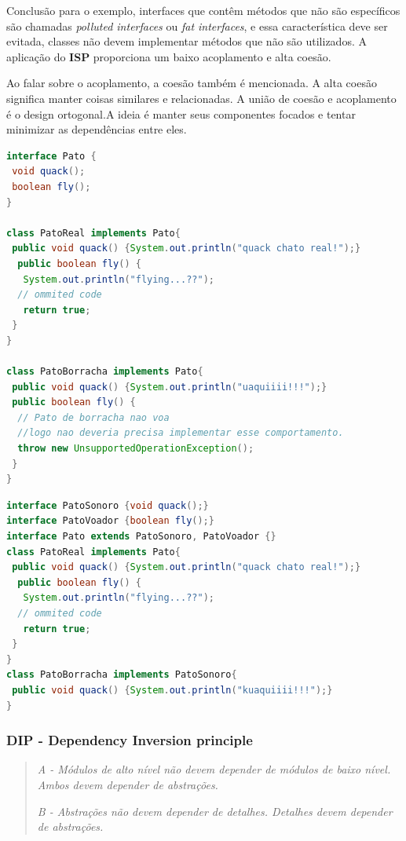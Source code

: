 \documentclass[12pt]{article}
\begin{document}
Conclusão para o exemplo, interfaces que contêm métodos que não são específicos são chamadas \textit{polluted interfaces} ou \textit{fat interfaces}, e essa característica deve ser evitada, classes não devem implementar métodos que não são utilizados. A aplicação do \textbf{ISP} proporciona um baixo acoplamento e alta coesão.

Ao falar sobre o acoplamento, a coesão também é mencionada. A alta coesão significa manter coisas similares e relacionadas. A união de coesão e acoplamento é o design ortogonal.A ideia é manter seus componentes focados e tentar minimizar as dependências entre eles.

\begin{lstlisting}[caption=Exemplo de violação ao ISP,language=java]
interface Pato {
 void quack();
 boolean fly();
}

class PatoReal implements Pato{
 public void quack() {System.out.println("quack chato real!");}
  public boolean fly() {
   System.out.println("flying...??");
  // ommited code
   return true;
 }
}

class PatoBorracha implements Pato{
 public void quack() {System.out.println("uaquiiii!!!");}
 public boolean fly() {
  // Pato de borracha nao voa
  //logo nao deveria precisa implementar esse comportamento.
  throw new UnsupportedOperationException();
 }
}
\end{lstlisting}
\begin{lstlisting}[caption=Exemplo em conformidade ao ISP,language=java]
interface PatoSonoro {void quack();}
interface PatoVoador {boolean fly();}
interface Pato extends PatoSonoro, PatoVoador {}
class PatoReal implements Pato{
 public void quack() {System.out.println("quack chato real!");}
  public boolean fly() {
   System.out.println("flying...??");
  // ommited code
   return true;
 }
}
class PatoBorracha implements PatoSonoro{
 public void quack() {System.out.println("kuaquiiii!!!");}
}

\end{lstlisting}

\subsubsection{DIP - Dependency Inversion principle}
\begin{quote}
	\textit{A - Módulos de alto nível não devem depender de módulos de baixo nível. Ambos devem depender de abstrações.}
	
	\textit{B -  Abstrações não devem depender de detalhes. Detalhes devem depender de abstrações.}	
\end{quote}
\end{document}
